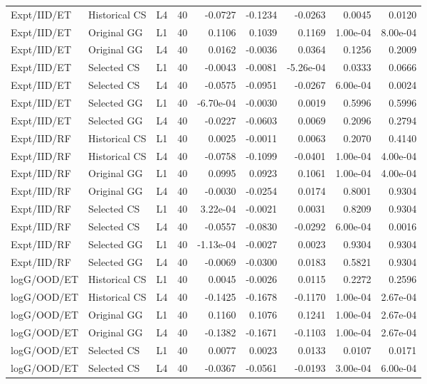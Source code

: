 \documentclass[9pt]{article}
\begin{document}
\begin{longtable}{p{2.0cm}p{1.35cm}ccrrrrr}
Expt/IID/ET & Historical CS & L4 & 40 & -0.0727 & -0.1234 & -0.0263 & 0.0045 & 0.0120\\
Expt/IID/ET & Original GG & L1 & 40 & 0.1106 & 0.1039 & 0.1169 & 1.00e-04 & 8.00e-04\\
Expt/IID/ET & Original GG & L4 & 40 & 0.0162 & -0.0036 & 0.0364 & 0.1256 & 0.2009\\
Expt/IID/ET & Selected CS & L1 & 40 & -0.0043 & -0.0081 & -5.26e-04 & 0.0333 & 0.0666\\
Expt/IID/ET & Selected CS & L4 & 40 & -0.0575 & -0.0951 & -0.0267 & 6.00e-04 & 0.0024\\
Expt/IID/ET & Selected GG & L1 & 40 & -6.70e-04 & -0.0030 & 0.0019 & 0.5996 & 0.5996\\
Expt/IID/ET & Selected GG & L4 & 40 & -0.0227 & -0.0603 & 0.0069 & 0.2096 & 0.2794\\
Expt/IID/RF & Historical CS & L1 & 40 & 0.0025 & -0.0011 & 0.0063 & 0.2070 & 0.4140\\
Expt/IID/RF & Historical CS & L4 & 40 & -0.0758 & -0.1099 & -0.0401 & 1.00e-04 & 4.00e-04\\
Expt/IID/RF & Original GG & L1 & 40 & 0.0995 & 0.0923 & 0.1061 & 1.00e-04 & 4.00e-04\\
Expt/IID/RF & Original GG & L4 & 40 & -0.0030 & -0.0254 & 0.0174 & 0.8001 & 0.9304\\
Expt/IID/RF & Selected CS & L1 & 40 & 3.22e-04 & -0.0021 & 0.0031 & 0.8209 & 0.9304\\
Expt/IID/RF & Selected CS & L4 & 40 & -0.0557 & -0.0830 & -0.0292 & 6.00e-04 & 0.0016\\
Expt/IID/RF & Selected GG & L1 & 40 & -1.13e-04 & -0.0027 & 0.0023 & 0.9304 & 0.9304\\
Expt/IID/RF & Selected GG & L4 & 40 & -0.0069 & -0.0300 & 0.0183 & 0.5821 & 0.9304\\
logG/OOD/ET & Historical CS & L1 & 40 & 0.0045 & -0.0026 & 0.0115 & 0.2272 & 0.2596\\
logG/OOD/ET & Historical CS & L4 & 40 & -0.1425 & -0.1678 & -0.1170 & 1.00e-04 & 2.67e-04\\
logG/OOD/ET & Original GG & L1 & 40 & 0.1160 & 0.1076 & 0.1241 & 1.00e-04 & 2.67e-04\\
logG/OOD/ET & Original GG & L4 & 40 & -0.1382 & -0.1671 & -0.1103 & 1.00e-04 & 2.67e-04\\
logG/OOD/ET & Selected CS & L1 & 40 & 0.0077 & 0.0023 & 0.0133 & 0.0107 & 0.0171\\
logG/OOD/ET & Selected CS & L4 & 40 & -0.0367 & -0.0561 & -0.0193 & 3.00e-04 & 6.00e-04\\

\end{longtable}
\end{document}
